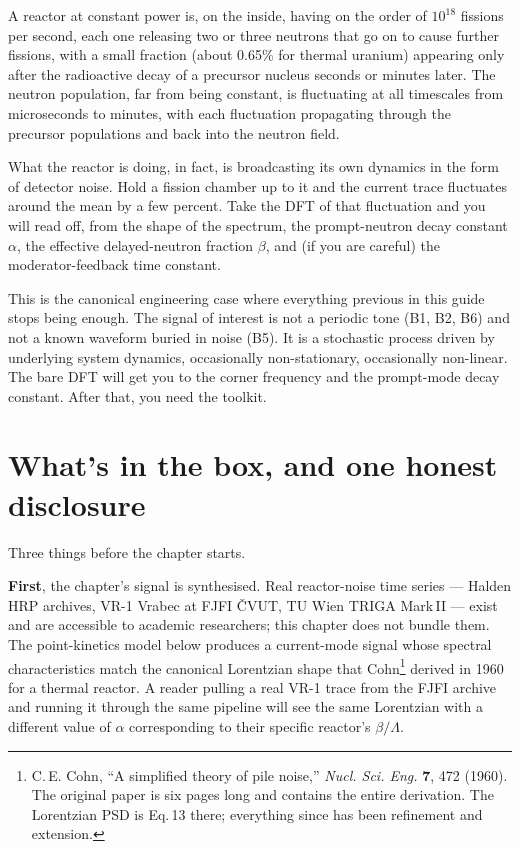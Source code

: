\documentclass[11pt,a4paper,openany]{book}
\begin{document}
A reactor at constant power is, on the inside, having on the order of $10^{18}$
fissions per second, each one releasing two or three neutrons that go on to
cause further fissions, with a small fraction (about 0.65\% for thermal
uranium) appearing only after the radioactive decay of a precursor nucleus
seconds or minutes later. The neutron population, far from being constant,
is fluctuating at all timescales from microseconds to minutes, with each
fluctuation propagating through the precursor populations and back into the
neutron field.

What the reactor is doing, in fact, is broadcasting its own dynamics in the
form of detector noise. Hold a fission chamber up to it and the current trace
fluctuates around the mean by a few percent. Take the DFT of that fluctuation
and you will read off, from the shape of the spectrum, the prompt-neutron decay
constant $\alpha$, the effective delayed-neutron fraction $\beta$, and (if you
are careful) the moderator-feedback time constant.

This is the canonical engineering case where everything previous in this guide
stops being enough. The signal of interest is not a periodic tone (B1, B2, B6)
and not a known waveform buried in noise (B5). It is a stochastic process
driven by underlying system dynamics, occasionally non-stationary, occasionally
non-linear. The bare DFT will get you to the corner frequency and the
prompt-mode decay constant. After that, you need the toolkit.

\section{What's in the box, and one honest disclosure}

Three things before the chapter starts.

\textbf{First}, the chapter's signal is synthesised. Real reactor-noise time
series --- Halden HRP archives, VR-1 Vrabec at FJFI \v{C}VUT, TU Wien TRIGA
Mark\,II --- exist and are accessible to academic researchers; this chapter
does not bundle them. The point-kinetics model below produces a current-mode
signal whose spectral characteristics match the canonical Lorentzian shape
that Cohn\footnote{C.\,E. Cohn, ``A simplified theory of pile noise,''
\emph{Nucl. Sci. Eng.} \textbf{7}, 472 (1960). The original paper is six
pages long and contains the entire derivation. The Lorentzian PSD is Eq.\,13
there; everything since has been refinement and extension.}
derived in 1960 for a thermal reactor. A reader pulling a real VR-1 trace from
the FJFI archive and running it through the same pipeline will see the same
Lorentzian with a different value of $\alpha$ corresponding to their specific
reactor's $\beta/\Lambda$.
\end{document}
